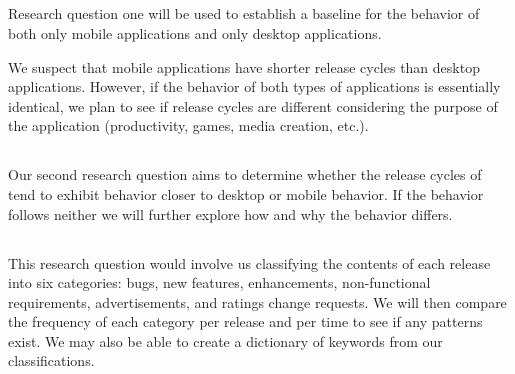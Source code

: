 \documentclass{acm_proc_article-sp}
\begin{document}
\subsection{\RQOne }
Research question one will be used to establish a baseline for the behavior of both only mobile applications and only desktop applications.

We suspect that mobile applications have shorter release cycles than desktop applications.
However, if the behavior of both types of applications is essentially identical, we plan to see if release cycles are different considering the purpose of the application (\eg productivity, games, media creation, etc.).

\subsection{\RQTwo }
Our second research question aims to determine whether the release cycles of \sibs tend to exhibit behavior closer to desktop or mobile behavior. 
If the behavior follows neither we will further explore how and why the behavior differs.




\subsection{\RQThree }
This research question would involve us classifying the contents of each release into six categories: bugs, new features, enhancements, non-functional requirements, advertisements, and ratings change requests.
We will then compare the frequency of each category per release and per time to see if any patterns exist.
We may also be able to create a dictionary of keywords from our classifications.
\end{document}
